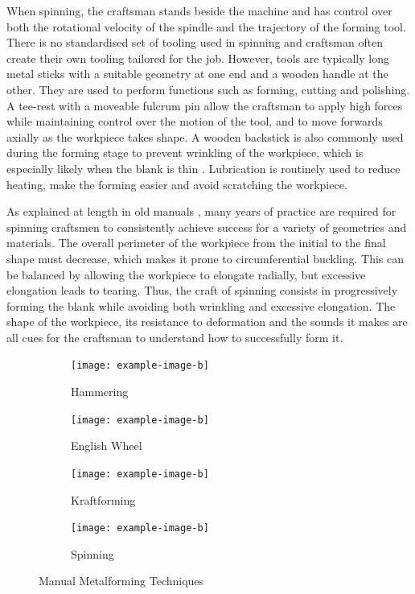 When spinning, the craftsman stands beside the machine and has control over both the rotational velocity of the spindle and the trajectory of the forming tool. There is no standardised set of tooling used in spinning and craftsman often create their own tooling tailored for the job. However, tools are typically long metal sticks with a suitable geometry at one end and a wooden handle at the other. They are used to perform functions such as forming, cutting and polishing. A tee-rest with a moveable fulcrum pin allow the craftsman to apply high forces while maintaining control over the motion of the tool, and to move forwards axially as the workpiece takes shape. A wooden backstick is also commonly used during the forming stage to prevent wrinkling of the workpiece, which is especially likely when the blank is thin \citep{Jawale2019AnSpinning}. Lubrication is routinely used to reduce heating, make the forming easier and avoid scratching the workpiece. 

As explained at length in old manuals \citet{Holtzappfel1852TurningManipulation,Tuells1912MetalUsed}, many years of practice are required for spinning craftsmen to consistently achieve success for a variety of geometries and materials. The overall perimeter of the workpiece from the initial to the final shape must decrease, which makes it prone to circumferential buckling. This can be balanced by allowing the workpiece to elongate radially, but excessive elongation leads to tearing. Thus, the craft of spinning consists in progressively forming the blank while avoiding both wrinkling and excessive elongation. The shape of the workpiece, its resistance to deformation and the sounds it makes are all cues for the craftsman to understand how to successfully form it. 

\begin{figure}[b]
\begin{subfigure}[b]{.23\linewidth}
	\centering
    \texttt{[image: example-image-b]}
    \caption{Hammering}
    \label{fig:HammeringProcess}
\end{subfigure}
%
\begin{subfigure}[b]{.23\linewidth}
	\centering
    \texttt{[image: example-image-b]}
	\caption{English Wheel}
	\label{fig:WheelingProcess}
\end{subfigure}
%
\begin{subfigure}[b]{.23\linewidth}
	\centering
	\texttt{[image: example-image-b]}
    \caption{Kraftforming}
	\label{fig:KraftformingProcess}
\end{subfigure}
%
\begin{subfigure}[b]{.23\linewidth}
	\centering
    \texttt{[image: example-image-b]}
	\caption{Spinning}
	\label{fig:SpinningProcess}
\end{subfigure}
\caption{Manual Metalforming Techniques}
\label{fig:ManualTech}
\end{figure}



